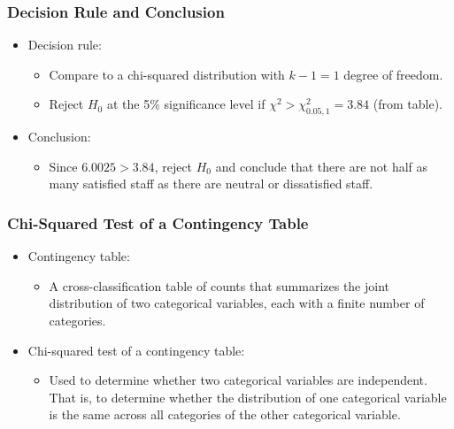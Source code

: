 \documentclass[12pt]{beamer}
\begin{document}
\begin{frame}
	\frametitle{Decision Rule and Conclusion}
	
	\begin{itemize}[label={\color{blue}$\blacktriangleright$}]
		\item Decision rule:
		\begin{itemize}[label={\color{blue}$\blacktriangleright$}]
			\item Compare to a chi-squared distribution with $k-1=1$ degree of freedom.
			\item Reject $H_0$ at the 5\% significance level if $\chi^2 > \chi^2_{0.05,1} = 3.84$ (from table).
		\end{itemize}
		
		\item Conclusion:
		\begin{itemize}[label={\color{blue}$\blacktriangleright$}]
			\item Since $6.0025 > 3.84$, reject $H_0$ and conclude that there are not half as many satisfied staff as there are neutral or dissatisfied staff.
		\end{itemize}
	\end{itemize}
	
\end{frame}
\begin{frame}
	\frametitle{Chi-Squared Test of a Contingency Table}
	
	\begin{itemize}[label={\color{blue}$\blacktriangleright$}]
		\item Contingency table:
		\begin{itemize}[label={\color{blue}$\blacktriangleright$}]
			\item A cross-classification table of counts that summarizes the joint distribution of two categorical variables, each with a finite number of categories.
		\end{itemize}
		
		\item Chi-squared test of a contingency table:
		\begin{itemize}[label={\color{blue}$\blacktriangleright$}]
			\item Used to determine whether two categorical variables are independent. That is, to determine whether the distribution of one categorical variable is the same across all categories of the other categorical variable.
		\end{itemize}
	\end{itemize}
	
\end{frame}
\end{document}
